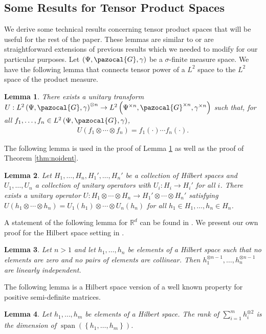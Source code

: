 \documentclass[aos,preprint]{imsart}
\def\rn{\mathbb{R}}
\def\l{\left}
\def\r{\right}
\def\sG{\pazocal{G}}
\def\spn{\operatorname{span}}
\theoremstyle{plain}
\newtheorem{lem}{Lemma}[section]
\theoremstyle{defintion}
\begin{document}
	\subsection{Some Results for Tensor Product Spaces}
	We derive some technical results concerning tensor product spaces that will be useful for the rest of the paper. These lemmas are similar to or  are straightforward extensions of previous results which we needed to modify for our particular purposes. Let $\left( \Psi, \sG, \gamma \right)$ be a $\sigma$-finite measure space. We have the following lemma that connects tensor power of a $L^2$ space to the $L^2$ space of the product measure. 
	\begin{lem}
		\label{lem:l2prod}
		There exists a unitary transform $U:L^2\left( \Psi, \sG, \gamma \right)^{\otimes n} \to L^2\left( \Psi^{\times n}, \sG^{\times n}, \gamma^{\times n} \right)$ such that, for all $f_1,\ldots, f_n \in L^2\left( \Psi, \sG, \gamma \right)$,
		\begin{align*}
			U\left( f_1\otimes \cdots \otimes f_n \right) = f_1(\cdot)\cdots f_n(\cdot).
		\end{align*}
	\end{lem}
	The following lemma is used in the proof of Lemma \ref{lem:l2prod} as well as the proof of Theorem \ref{thm:noident}.
	\begin{lem} \label{lem:unitprod}
		Let $H_1,\ldots, H_n, H_1',\ldots, H_n'$ be a collection of Hilbert spaces and $U_1,\ldots,U_n$ a collection of unitary operators with $U_i:H_i \to H_i'$ for all $i$. There exists a unitary operator $U:H_1 \otimes \cdots \otimes H_n \to H_1' \otimes \cdots \otimes H_n'$ satisfying $U\left( h_1 \otimes\cdots \otimes h_n \right) = U_1(h_1) \otimes \cdots \otimes U_n(h_n)$ for all $h_1 \in H_1 ,\ldots, h_n \in H_n$.
	\end{lem}
        A statement of the following lemma for $\rn^d$ can be found in \cite{symtensorrank}. We present our own proof for the Hilbert space setting in \cite{arxiv16}.
	\begin{lem}\label{lem:linind}
		Let $n>1$ and let $h_1,\ldots, h_n$ be elements of a Hilbert space such that no elements are zero and no pairs of elements are collinear. Then $h_1^{\otimes n-1},\ldots, h_n^{\otimes n-1}$ are linearly independent.
	\end{lem}
	The following lemma is a Hilbert space version of a well known property for positive semi-definite matrices.
	\begin{lem} \label{lem:tensrank}
		Let $h_1,\ldots,h_m$ be elements of a Hilbert space. The rank of $\sum_{i=1}^m h_i^{\otimes 2}$ is the dimension of $\spn\left( \l\{h_1,\ldots,h_m \r\}\right)$.
	\end{lem}
\end{document}
